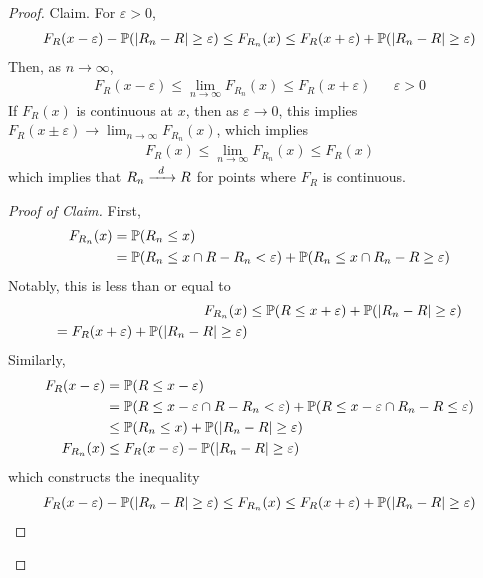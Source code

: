 \begin{proof}
    Claim. For $\varepsilon > 0$,
    \begin{align}
        F_R(x - \varepsilon) - \mathbb{P}(\abs{R_n - R} \ge \varepsilon) \le F_{R_n}(x) \le F_R(x + \varepsilon) + \mathbb{P}(\abs{R_n - R} \ge \varepsilon)
    \end{align}
    Then, as $n \to \infty$,
    \begin{align}
        F_R(x - \varepsilon) \le \lim_{n\to\infty} F_{R_n}(x) \le F_R(x + \varepsilon) && \varepsilon > 0
    \end{align}
    If $F_R(x)$ is continuous at $x$, then as $\varepsilon \to 0$, this implies $F_R(x \pm \varepsilon) \to \lim_{n\to\infty} F_{R_n}(x)$, which implies
    \begin{align}
        F_R(x) \le \lim_{n\to \infty} F_{R_n}(x) \le F_R(x)
    \end{align}
    which implies that $R_n \ce{->[$d$]} R$ for points where $F_R$ is continuous.
    \begin{proof}[Proof of Claim]
        First,
        \begin{align}
            F_{R_n}(x) &= \mathbb{P}(R_n \le x)\\
            &= \mathbb{P}(R_n \le x \cap R - R_n < \varepsilon) + \mathbb{P}(R_n \le x \cap R_n - R \ge \varepsilon)
        \end{align}
        Notably, this is less than or equal to
        \begin{align}
            F_{R_n}(x) &\le \mathbb{P}(R \le x + \varepsilon) + \mathbb{P}(\abs{R_n - R} \ge \varepsilon)\\
            = F_R(x + \varepsilon) + \mathbb{P}(\abs{R_n - R} \ge \varepsilon)
        \end{align}
        Similarly,
        \begin{align}
            F_R(x - \varepsilon) &= \mathbb{P}(R \le x - \varepsilon)\\
            &= \mathbb{P}(R \le x - \varepsilon \cap R - R_n < \varepsilon) + \mathbb{P}(R \le x - \varepsilon \cap R_n - R \le \varepsilon)\\
            &\le \mathbb{P}(R_n \le x) + \mathbb{P}(\abs{R_n - R} \ge \varepsilon)\\
            F_{R_n}(x) &\le F_R(x - \varepsilon) - \mathbb{P}(\abs{R_n - R} \ge \varepsilon)
        \end{align}
        which constructs the inequality
        \begin{align}
            F_R(x - \varepsilon) - \mathbb{P}(\abs{R_n - R} \ge \varepsilon) \le F_{R_n}(x) \le F_R(x + \varepsilon) + \mathbb{P}(\abs{R_n - R} \ge \varepsilon)
        \end{align}
    \end{proof}
\end{proof}

